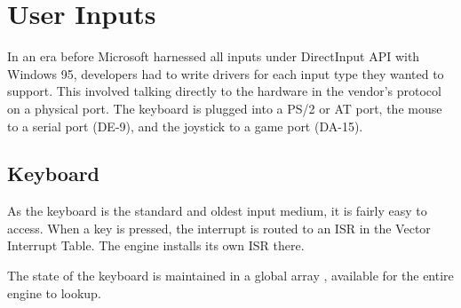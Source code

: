 \documentclass[book.tex]{subfiles}
\begin{document}
\section{User Inputs}
In an era before Microsoft harnessed all inputs under DirectInput API with Windows 95, developers had to write drivers for each input type they wanted to support. This involved talking directly to the hardware in the vendor's protocol on a physical port. The keyboard is plugged into a PS/2 or AT port, the mouse to a serial port (DE-9), and the joystick to a game port (DA-15).





\subsection{Keyboard}

As the keyboard is the standard and oldest input medium, it is fairly easy to access. When a key is pressed, the interrupt is routed to an ISR in the Vector Interrupt Table. The engine installs its own ISR there.\\


\par
\begin{minipage}{\textwidth}

\end{minipage}

The state of the keyboard is maintained in a global array , available for the entire engine to lookup.\\
\par

\begin{minipage}{\textwidth}

\end{minipage}
\end{document}
